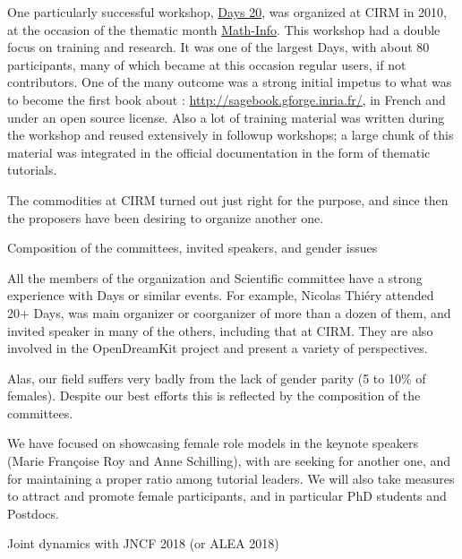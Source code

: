 \documentclass[12pt]{amsart}
\makeatletter
\def\subsection{\@startsection{subsection}{2}%
  \z@{.3\linespacing\@plus.5\linespacing}{.1\linespacing}%
  {\normalfont\bfseries}}
\makeatother
\begin{document}
One particularly successful workshop,
\href{https://www.lirmm.fr/arith/wiki/MathInfo2010/SageDays}{\Sage
  Days 20}, was organized at CIRM in 2010, at the occasion of the
thematic month
\href{https://www.lirmm.fr/arith/wiki/MathInfo2010/}{Math-Info}. This
workshop had a double focus on training and research. It was one of
the largest \Sage Days, with about 80 participants, many of which
became at this occasion regular \Sage users, if not contributors. One
of the many outcome was a strong initial impetus to what was to become
the first book about \Sage: \href{Calcul Mathématique avec
  Sage}{http://sagebook.gforge.inria.fr/}, in French and under an open
source license. Also a lot of training material was written during the
workshop and reused extensively in followup workshops; a large chunk
of this material was integrated in the \Sage official documentation in
the form of thematic tutorials.

The commodities at CIRM turned out just right for the purpose, and
since then the proposers have been desiring to organize another one.

\subsection{Composition of the committees, invited speakers, and gender issues}

All the members of the organization and Scientific committee have a
strong experience with \Sage Days or similar events. For example,
Nicolas Thiéry attended 20+ \Sage Days, was main organizer or
coorganizer of more than a dozen of them, and invited speaker in many
of the others, including that at CIRM. They are also involved in the
OpenDreamKit project and present a variety of perspectives.

Alas, our field suffers very badly from the lack of gender parity (5
to 10\% of females). Despite our best efforts this is reflected by the
composition of the committees.

We have focused on showcasing female role models in the keynote
speakers (Marie Françoise Roy and Anne Schilling), with are seeking
for another one, and for maintaining a proper ratio among tutorial
leaders. We will also take measures to attract and promote female
participants, and in particular PhD students and Postdocs.

\subsection{Joint dynamics with JNCF 2018 (or ALEA 2018)}
\end{document}
